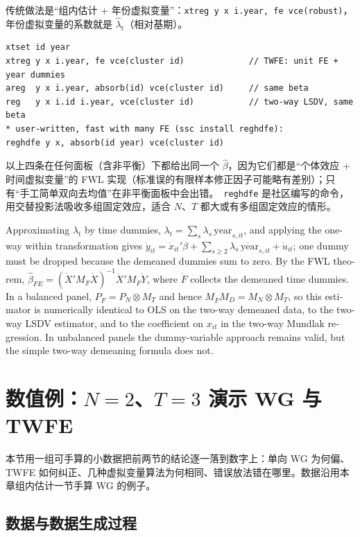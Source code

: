 传统做法是“组内估计 + 年份虚拟变量”：\texttt{xtreg y x i.year, fe vce(robust)}，年份虚拟变量的系数就是 $\hat\lambda_t$（相对基期）。
\begin{lstlisting}
xtset id year
xtreg y x i.year, fe vce(cluster id)             // TWFE: unit FE + year dummies
areg  y x i.year, absorb(id) vce(cluster id)     // same beta
reg   y x i.id i.year, vce(cluster id)           // two-way LSDV, same beta
* user-written, fast with many FE (ssc install reghdfe):
reghdfe y x, absorb(id year) vce(cluster id)
\end{lstlisting}
以上四条在任何面板（含非平衡）下都给出同一个 $\hat\beta$，因为它们都是“个体效应 + 时间虚拟变量”的 FWL 实现（标准误的有限样本修正因子可能略有差别）；只有“手工简单双向去均值”在非平衡面板中会出错。\tagext\ \texttt{reghdfe} 是社区编写的命令，用交替投影法吸收多组固定效应，适合 $N$、$T$ 都大或有多组固定效应的情形。

\begin{english}
Approximating $\lambda_t$ by time dummies, $\lambda_t=\sum_s\lambda_s\,\mathrm{year}_{s,it}$, and applying the one-way within transformation gives $\dot y_{it}=\dot x_{it}'\beta+\sum_{s\ge2}\lambda_s\,\dot{\mathrm{year}}_{s,it}+\dot u_{it}$; one dummy must be dropped because the demeaned dummies sum to zero. By the FWL theorem, $\hat\beta_{FE}=(\dot X'M_{\dot F}\dot X)^{-1}\dot X'M_{\dot F}\dot Y$, where $\dot F$ collects the demeaned time dummies. In a balanced panel, $P_{\dot F}=P_N\otimes M_T$ and hence $M_{\dot F}M_D=M_N\otimes M_T$, so this estimator is numerically identical to OLS on the two-way demeaned data, to the two-way LSDV estimator, and to the coefficient on $x_{it}$ in the two-way Mundlak regression. In unbalanced panels the dummy-variable approach remains valid, but the simple two-way demeaning formula does not.
\end{english}

\section{数值例：\texorpdfstring{$N=2$、$T=3$}{N=2, T=3} 演示 WG 与 TWFE}\label{sec:U10b-numex}

本节用一组可手算的小数据把前两节的结论逐一落到数字上：单向 WG 为何偏、TWFE 如何纠正、几种虚拟变量算法为何相同、错误放法错在哪里。数据沿用本章组内估计一节手算 WG 的例子。

\subsection{数据与数据生成过程}

